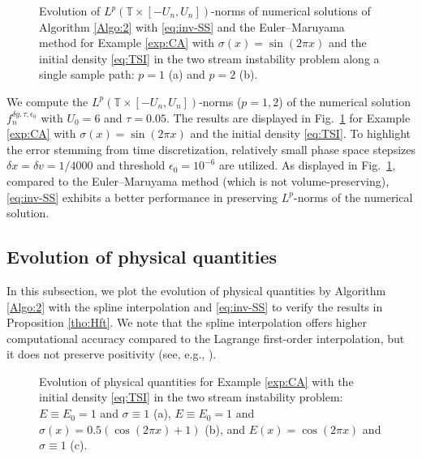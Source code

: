 \documentclass[11pt,reqno]{amsproc}
\numberwithin{equation}{section}
\begin{document}
 \begin{figure}[!htbp]
	\centering
	\hspace{4em}
	 \caption{Evolution of $L^p(\mathbb{T}\times[-U_n,U_n])$-norms of numerical solutions of Algorithm \ref{Algo:2} with \eqref{eq:inv-SS} and the Euler--Maruyama method
	  for Example \ref{exp:CA} with $\sigma(x)=\sin(2\pi x)$ and the initial density \eqref{eq:TSI} in the two stream instability problem along a single sample path: $p=1$ \textup{(}a\textup{)} and $p=2$ \textup{(}b\textup{)}.
}
	\label{Fig:Norm}
\end{figure}
We 
compute
 the $L^p(\mathbb T\times[-U_n,U_n])$-norms ($p=1,2$) of the numerical solution $f_n^{\delta y,\tau,\epsilon_0}$ with $U_0=6$ and 
  $\tau=0.05$. 
The results are displayed in Fig.\ \ref{Fig:Norm} for Example \ref{exp:CA} with $\sigma(x)=\sin(2\pi x)$ and the initial density 
\eqref{eq:TSI}.
To highlight the error stemming from time discretization, relatively small phase space stepsizes $\delta x=\delta v=1/4000$ and threshold $\epsilon_0=10^{-6}$ are utilized. As displayed in Fig.\ \ref{Fig:Norm}, compared to the Euler--Maruyama method (which is not volume-preserving),  \eqref{eq:inv-SS} exhibits a better performance in preserving $L^p$-norms of the numerical solution.



\subsection{Evolution of physical quantities}\label{S5.4}
In this subsection, we plot the evolution of physical quantities
by Algorithm \ref{Algo:2} with the spline interpolation and \eqref{eq:inv-SS} to
verify the results in Proposition \ref{tho:Hft}. We note that the spline interpolation offers higher computational accuracy compared to the Lagrange first-order interpolation, but it does not preserve positivity (see, e.g., \cite{BM08}).
\begin{figure}[!htbp]
\centering
{}
 \caption{Evolution of physical quantities for Example \ref{exp:CA} with the initial density \eqref{eq:TSI} in the two stream instability problem: $E\equiv E_0=1$ and $\sigma\equiv 1$ \textup{(}a\textup{)}, $E\equiv E_0=1$ and $\sigma(x)=0.5(\cos(2\pi x)+1)$ \textup{(}b\textup{)}, and $E(x)=\cos(2\pi x)$ and $\sigma \equiv 1$ \textup{(}c\textup{)}.}\label{Fig:EPC} 
\end{figure} 
\end{document}
